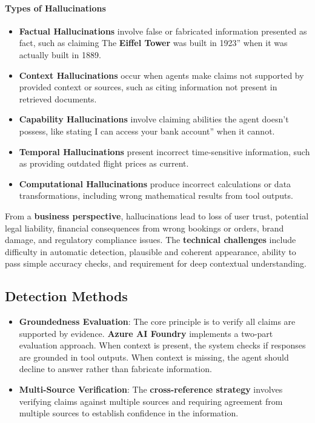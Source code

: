 \begin{TNtwocol}
\paragraph{\textbf{Types of Hallucinations}}
\begin{itemize}
\item \textbf{Factual Hallucinations} involve false or fabricated information presented as fact, such as claiming The \textbf{Eiffel Tower} was built in 1923'' when it was actually built in 1889.
\item \textbf{Context Hallucinations} occur when agents make claims not supported by provided context or sources, such as citing information not present in retrieved documents. 
\item\textbf{Capability Hallucinations} involve claiming abilities the agent doesn't possess, like stating I can access your bank account'' when it cannot. \item \textbf{Temporal Hallucinations} present incorrect time-sensitive information, such as providing outdated flight prices as current. 
\item \textbf{Computational Hallucinations} produce incorrect calculations or data transformations, including wrong mathematical results from tool outputs.
\end{itemize}

From a \textbf{business perspective}, hallucinations lead to loss of user trust, potential legal liability, financial consequences from wrong bookings or orders, brand damage, and regulatory compliance issues. The \textbf{technical challenges} include difficulty in automatic detection, plausible and coherent appearance, ability to pass simple accuracy checks, and requirement for deep contextual understanding.

\subsection*{Detection Methods}
\begin{itemize}
\item{\textbf{Groundedness Evaluation}}: The core principle is to verify all claims are supported by evidence. \textbf{Azure AI Foundry} implements a two-part evaluation approach. When context is present, the system checks if responses are grounded in tool outputs. When context is missing, the agent should decline to answer rather than fabricate information.

\item{\textbf{Multi-Source Verification}}: The \textbf{cross-reference strategy} involves verifying claims against multiple sources and requiring agreement from multiple sources to establish confidence in the information.


\end{itemize}
\end{TNtwocol}
